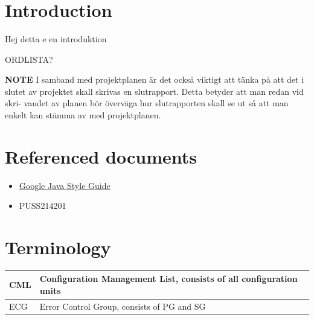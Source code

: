 \documentclass{article}
\date {#1}
\title {
    \documentNumber {01}    %
    \documentVersion {0.1}
    \documentTitle {Software development plan - SDP}
    \documentGroup {2}
    \documentResponsible {(PG) Projet-management Group}
    \documentAuthors {(PG) Projet-management Group}
    \documentDate {\today}
}
\begin{document}
\maketitle
\thispagestyle{empty}

\newpage

\tableofcontents

\newpage

\section{Introduction}
    Hej detta e en introduktion
    
    ORDLISTA?
    
    \textbf{NOTE}
    I samband med projektplanen är det också viktigt att tänka på att det i slutet
    av projektet skall skrivas en slutrapport. Detta betyder att man redan vid skri-
    vandet av planen bör överväga hur slutrapporten skall se ut så att man enkelt
    kan stämma av med projektplanen.

\section{Referenced documents}
    \begin{itemize}
        \item \href{https://google.github.io/styleguide/javaguide.html}{Google Java Style Guide}
        \item PUSS214201
    \end{itemize}
    
    


\section{Terminology}
    \renewcommand{\arraystretch}{1.7}  %
    
    \begin{table}[h]
        \centering
        \begin{tabular}{| p{1cm} | p{10cm} |}
            \hline 
                CML & Configuration Management List, consists of all configuration units \\
            \hline            
                ECG & Error Control Group, consists of PG and SG \\
            \hline
        \end{tabular}
    \end{table}
    
\end{document}
